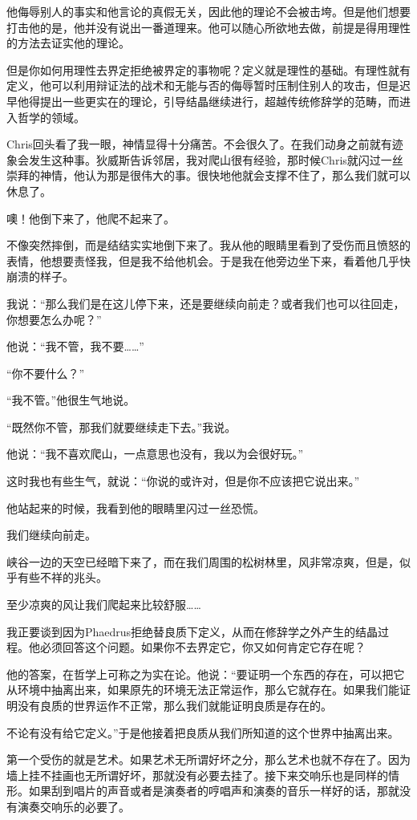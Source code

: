 \documentclass[UTF8]{article}
\begin{document}
\par 他侮辱别人的事实和他言论的真假无关，因此他的理论不会被击垮。但是他们想要打击他的是，他并没有说出一番道理来。他可以随心所欲地去做，前提是得用理性的方法去证实他的理论。
\par 但是你如何用理性去界定拒绝被界定的事物呢？定义就是理性的基础。有理性就有定义，他可以利用辩证法的战术和无能与否的侮辱暂时压制住别人的攻击，但是迟早他得提出一些更实在的理论，引导结晶继续进行，超越传统修辞学的范畴，而进入哲学的领域。
\par Chris回头看了我一眼，神情显得十分痛苦。不会很久了。在我们动身之前就有迹象会发生这种事。狄威斯告诉邻居，我对爬山很有经验，那时候Chris就闪过一丝崇拜的神情，他认为那是很伟大的事。很快地他就会支撑不住了，那么我们就可以休息了。
\par 噢！他倒下来了，他爬不起来了。
\par 不像突然摔倒，而是结结实实地倒下来了。我从他的眼睛里看到了受伤而且愤怒的表情，他想要责怪我，但是我不给他机会。于是我在他旁边坐下来，看着他几乎快崩溃的样子。
\par 我说：“那么我们是在这儿停下来，还是要继续向前走？或者我们也可以往回走，你想要怎么办呢？”
\par 他说：“我不管，我不要……”
\par “你不要什么？”
\par “我不管。”他很生气地说。
\par “既然你不管，那我们就要继续走下去。”我说。
\par 他说：“我不喜欢爬山，一点意思也没有，我以为会很好玩。”
\par 这时我也有些生气，就说：“你说的或许对，但是你不应该把它说出来。”
\par 他站起来的时候，我看到他的眼睛里闪过一丝恐慌。
\par 我们继续向前走。
\par 峡谷一边的天空已经暗下来了，而在我们周围的松树林里，风非常凉爽，但是，似乎有些不祥的兆头。
\par 至少凉爽的风让我们爬起来比较舒服……
\par 我正要谈到因为Phaedrus拒绝替良质下定义，从而在修辞学之外产生的结晶过程。他必须回答这个问题。如果你不去界定它，你又如何肯定它存在呢？
\par 他的答案，在哲学上可称之为实在论。他说：“要证明一个东西的存在，可以把它从环境中抽离出来，如果原先的环境无法正常运作，那么它就存在。如果我们能证明没有良质的世界运作不正常，那么我们就能证明良质是存在的。
\par 不论有没有给它定义。”于是他接着把良质从我们所知道的这个世界中抽离出来。
\par 第一个受伤的就是艺术。如果艺术无所谓好坏之分，那么艺术也就不存在了。因为墙上挂不挂画也无所谓好坏，那就没有必要去挂了。接下来交响乐也是同样的情形。如果刮到唱片的声音或者是演奏者的哼唱声和演奏的音乐一样好的话，那就没有演奏交响乐的必要了。
\end{document}
